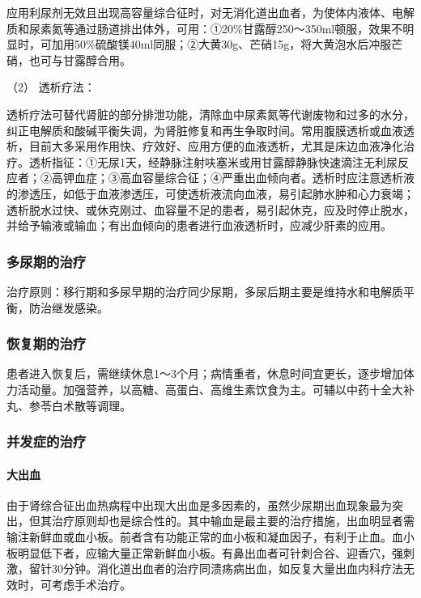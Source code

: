 应用利尿剂无效且出现高容量综合征时，对无消化道出血者，为使体内液体、电解质和尿素氮等通过肠道排出体外，可用：①20\%甘露醇250～350ml顿服，效果不明显时，可加用50\%硫酸镁40ml同服；②大黄30g、芒硝15g，将大黄泡水后冲服芒硝，也可与甘露醇合用。

\hypertarget{text00223.htmlux5cux23CHP7-7-3-3-4-2}{}
（2） 透析疗法：

透析疗法可替代肾脏的部分排泄功能，清除血中尿素氮等代谢废物和过多的水分，纠正电解质和酸碱平衡失调，为肾脏修复和再生争取时间。常用腹膜透析或血液透析，目前大多采用作用快、疗效好、应用方便的血液透析，尤其是床边血液净化治疗。透析指征：①无尿1天，经静脉注射呋塞米或用甘露醇静脉快速滴注无利尿反应者；②高钾血症；③高血容量综合征；④严重出血倾向者。透析时应注意透析液的渗透压，如低于血液渗透压，可使透析液流向血液，易引起肺水肿和心力衰竭；透析脱水过快、或休克刚过、血容量不足的患者，易引起休克，应及时停止脱水，并给予输液或输血；有出血倾向的患者进行血液透析时，应减少肝素的应用。

\subsubsection{多尿期的治疗}

治疗原则：移行期和多尿早期的治疗同少尿期，多尿后期主要是维持水和电解质平衡，防治继发感染。

\subsubsection{恢复期的治疗}

患者进入恢复后，需继续休息1～3个月；病情重者，休息时间宜更长，逐步增加体力活动量。加强营养，以高糖、高蛋白、高维生素饮食为主。可辅以中药十全大补丸、参苓白术散等调理。

\subsubsection{并发症的治疗}

\paragraph{大出血}

由于肾综合征出血热病程中出现大出血是多因素的，虽然少尿期出血现象最为突出，但其治疗原则却也是综合性的。其中输血是最主要的治疗措施，出血明显者需输注新鲜血或血小板。前者含有功能正常的血小板和凝血因子，有利于止血。血小板明显低下者，应输大量正常新鲜血小板。有鼻出血者可针刺合谷、迎香穴，强刺激，留针30分钟。消化道出血者的治疗同溃疡病出血，如反复大量出血内科疗法无效时，可考虑手术治疗。

